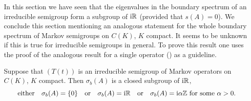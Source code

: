 In this section we have seen that the eigenvalues in the boundary spectrum of an irreducible semigroup form a subgroup of\/ $\mathrm{i} \mathbb{R}$ (provided that $s(A) = 0$).
We conclude this section mentioning an analogous statement for the whole boundary spectrum of Markov semigroups on $C(K)$, $K$ compact.
It seems to be unknown if this is true for irreducible semigroups in general.
To prove this result one uses the proof of the analogous result for a single operator (\cf \textcite[Theorem~7]{schaefer:1968}) as a guideline.
\begin{theorem}\label{thm:b3-3.11}
	Suppose that $(T(t))$ is an irreducible semigroup of Markov operators%
    on $C(K)$, $K$ compact.
	Then $\sigma_{b}(A)$ is a closed subgroup of\/ $\mathrm{i} \mathbb{R}$, \ie
   \[%
   \text{either}\quad \sigma_{b}(A) = \{0\}\quad\text{or}\quad \sigma_{b}(A) = \im\R\quad\text{or}\quad\sigma_{b}(A) =\im\alpha\Z \text{  for some } \alpha > 0 .
   \]
\end{theorem}

